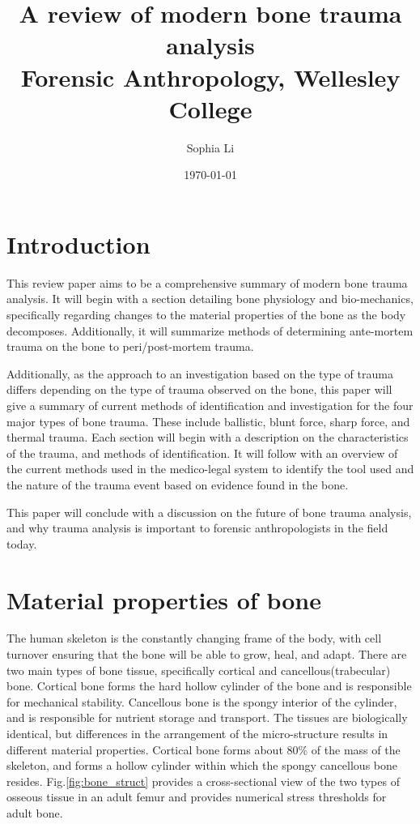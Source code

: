 \documentclass[titlepage]{article}
\title{A review of modern bone trauma analysis\\ \large Forensic Anthropology, Wellesley College}
\author{Sophia Li}
\date{\today \\ \vspace{5em}}
\begin{document}
\maketitle


\section{Introduction}
This review paper aims to be a comprehensive summary of modern bone trauma analysis. It will begin with a section detailing bone physiology and bio-mechanics, specifically regarding changes to the material properties of the bone as the body decomposes. Additionally, it will summarize methods of determining ante-mortem trauma on the bone to peri/post-mortem trauma.

Additionally, as the approach to an investigation based on the type of trauma differs depending on the type of trauma observed on the bone, this paper will give a summary of current methods of identification and investigation for the four major types of bone trauma. These include ballistic, blunt force, sharp force, and thermal trauma. Each section will begin with a description on the characteristics of the trauma, and methods of identification. It will follow with an overview of the current methods used in the medico-legal system to identify the tool used and the nature of the trauma event based on evidence found in the bone.

This paper will conclude with a discussion on the future of bone trauma analysis, and why trauma analysis is important to forensic anthropologists in the field today.

\newpage
\section{Material properties of bone}
The human skeleton is the constantly changing frame of the body, with cell turnover ensuring that the bone will be able to grow, heal, and adapt. There are two main types of bone tissue, specifically cortical and cancellous(trabecular) bone. Cortical bone forms the hard hollow cylinder of the bone and is responsible for mechanical stability. Cancellous bone is the spongy interior of the cylinder, and is responsible for nutrient storage and transport. The tissues are biologically identical, but differences in the arrangement of the micro-structure results in different material properties. Cortical bone forms about 80\% of the mass of the skeleton, and forms a hollow cylinder within which the spongy cancellous bone resides.\cite{bone} Fig.\ref{fig:bone_struct} provides a cross-sectional view of the two types of osseous tissue in an adult femur and provides numerical stress thresholds for adult bone.\\
\end{document}
